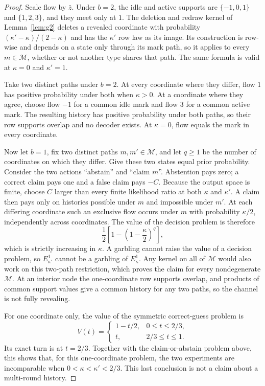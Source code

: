 \begin{proof}
Scale flow by $\bar z$. Under $b = 2$, the idle and active supports are
$\{-1,0,1\}$ and $\{1,2,3\}$, and they meet only at $1$. The deletion and redraw kernel of
Lemma~\ref{lem:g2} deletes a revealed coordinate with probability
$(\kappa'-\kappa)/(2-\kappa)$ and has the $\kappa'$ row law as its image. Its construction is
row-wise and depends on a state only through its mark path, so it applies to every
$m\in\mathcal M$, whether or not another type shares that path. The same formula is valid at
$\kappa=0$ and $\kappa'=1$.

Take two distinct paths under $b = 2$. At every coordinate where they differ, flow $1$ has positive
probability under both when $\kappa>0$. At a coordinate where they agree, choose flow $-1$ for a
common idle mark and flow $3$ for a common active mark. The resulting history has positive
probability under both paths, so their row supports overlap and no decoder exists. At $\kappa=0$,
flow equals the mark in every coordinate.

Now let $b = 1$, fix two distinct paths $m,m'\in\mathcal M$, and let $q\geq1$ be the number of
coordinates on which they differ. Give these two states equal prior probability. Consider the two
actions ``abstain'' and ``claim $m$''. Abstention pays zero; a correct claim pays one and a false
claim pays $-C$. Because the output space is finite, choose $C$ larger than every finite likelihood
ratio at both $\kappa$ and $\kappa'$. A claim then pays only on histories possible under $m$ and
impossible under $m'$. At each differing coordinate such an exclusive flow occurs under $m$ with
probability $\kappa/2$, independently across coordinates. The value of the decision problem is
therefore
\[
\frac12\left[1-\left(1-\frac{\kappa}{2}\right)^q\right],
\]
which is strictly increasing in $\kappa$. A garbling cannot raise the value of a decision problem,
so $E^1_{\kappa'}$ cannot be a garbling of $E^1_\kappa$. Any kernel on all of $\mathcal M$ would
also work on this two-path restriction, which proves the claim for every nondegenerate
$\mathcal M$. At an interior node the one-coordinate row supports overlap, and products of common
support values give a common history for any two paths, so the channel is not fully revealing.

For one coordinate only, the value of the symmetric correct-guess problem is
\[
V(t)=
\begin{cases}
1-t/2,&0\leq t\leq2/3,\\
t,&2/3\leq t\leq1.
\end{cases}
\]
Its exact turn is at $t=2/3$. Together with the claim-or-abstain problem above, this shows that, for
this one-coordinate problem, the two experiments are incomparable when
$0<\kappa<\kappa'<2/3$. This last conclusion is not a claim about a
multi-round history.


\end{proof}
